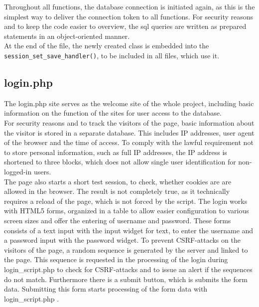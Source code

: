 Throughout all functions, the database connection is initiated again, as this is the simplest way to deliver the connection token to all functions. For security reasons and to keep the code easier to 
overview, the sql queries are written as prepared statements in an object-oriented manner.\\
At the end of the file, the newly created class is embedded into the \texttt{session\_set\_save\_handler()}, to be included in all files, which use it.

\subsection{login.php}
The login.php site serves as the welcome site of the whole project, including basic information on the function of the sites for user access to the database.\\
For security reasons and to track the visitors of the page, basic information about the visitor is stored in a separate database. This includes IP addresses, user agent of 
the browser and the time of access. To comply with the lawful requirement not to store personal information, such as full IP addresses, the IP address is shortened to three blocks,
which does not allow single user identification for non-logged-in users.\\
The page also starts a short test session, to check, whether cookies are are allowed in the browser. The result is not completely true, as it technically requires a reload of the 
page, which is not forced by the script.
The login works with HTML5 forms, organized in a table to allow easier configuration to various screen sizes and offer the entering of username and password. 
These forms consists of a text input with the input widget for text, to enter the username and a password input with the 
password widget. To prevent CSRF-attacks on the visitors of the page, a random sequence is generated by the server and linked to the page. This sequence is requested in the 
processing of the login during login\_script.php to check for CSRF-attacks and to issue an alert if the sequences do not match. 
Furthermore there is a submit button, which is submits the form data. Submitting this form starts processing of the form data with login\_script.php .


